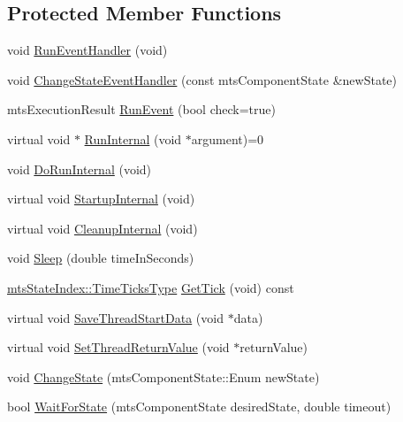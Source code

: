 \subsection*{Protected Member Functions}
\begin{DoxyCompactItemize}
\item 
void \hyperlink{classmts_task_a3ffb50ec20611c1372c1ef2fc7c252eb}{Run\+Event\+Handler} (void)
\item 
void \hyperlink{classmts_task_a8e7150ceb2934cc1b0d685f249c7c5c1}{Change\+State\+Event\+Handler} (const mts\+Component\+State \&new\+State)
\item 
mts\+Execution\+Result \hyperlink{classmts_task_a6bc857ef1d6f98c90f55846e940e00c3}{Run\+Event} (bool check=true)
\item 
virtual void $\ast$ \hyperlink{classmts_task_affcd896841ecfe785f898ef93a4202e9}{Run\+Internal} (void $\ast$argument)=0
\item 
void \hyperlink{classmts_task_a4f73416a80c5a7601a5cf3fce0167da5}{Do\+Run\+Internal} (void)
\item 
virtual void \hyperlink{classmts_task_a6816f8dfc6124376896318ebcdd4832b}{Startup\+Internal} (void)
\item 
virtual void \hyperlink{classmts_task_aba518c256e0c623e1e826cc7c76fe8eb}{Cleanup\+Internal} (void)
\item 
void \hyperlink{classmts_task_acaccf2da6d6f8f26c65657656d572131}{Sleep} (double time\+In\+Seconds)
\item 
\hyperlink{classmts_state_index_a80d0a5acdec3b616347ddea2912b6294}{mts\+State\+Index\+::\+Time\+Ticks\+Type} \hyperlink{classmts_task_a6beb5091a65dd8c7b501701a72cd5057}{Get\+Tick} (void) const 
\item 
virtual void \hyperlink{classmts_task_a194fbc7a2dba85f02d80b85bf84ad26c}{Save\+Thread\+Start\+Data} (void $\ast$data)
\item 
virtual void \hyperlink{classmts_task_a89f212237d9b7e453c91df8a1a6962d2}{Set\+Thread\+Return\+Value} (void $\ast$return\+Value)
\item 
void \hyperlink{classmts_task_a320a9995ca33358c5c334862b6fdf7a2}{Change\+State} (mts\+Component\+State\+::\+Enum new\+State)
\item 
bool \hyperlink{classmts_task_a2153a26a4a92583bae49696501da212e}{Wait\+For\+State} (mts\+Component\+State desired\+State, double timeout)
\end{DoxyCompactItemize}
